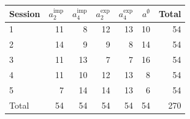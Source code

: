 \begin{tabular}{@{}l r r r r r r@{}}
\toprule
Session & \(a^{\mathrm{imp}}_{2}\) & \(a^{\mathrm{imp}}_{4}\) & \(a^{\mathrm{exp}}_{2}\) & \(a^{\mathrm{exp}}_{4}\) & \(a^{\emptyset}\) & Total \\
\midrule
1 & 11 & 8 & 12 & 13 & 10 & 54 \\
2 & 14 & 9 & 9 & 8 & 14 & 54 \\
3 & 11 & 13 & 7 & 7 & 16 & 54 \\
4 & 11 & 10 & 12 & 13 & 8 & 54 \\
5 & 7 & 14 & 14 & 13 & 6 & 54 \\
\midrule
Total & 54 & 54 & 54 & 54 & 54 & 270 \\
\bottomrule
\end{tabular}
